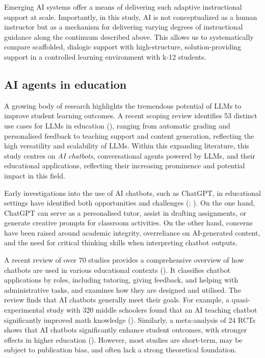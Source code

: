 \documentclass[
  11pt,
]{article}
\begin{document}
Emerging AI systems offer a means of delivering such adaptive instructional support at scale. Importantly, in this study, AI is not conceptualized as a human instructor but as a mechanism for delivering varying degrees of instructional guidance along the continuum described above. This allows us to systematically compare scaffolded, dialogic support with high-structure, solution-providing support in a controlled learning environment with k-12 students.

\subsection{AI agents in education}\label{ai-agents-in-education}

A growing body of research highlights the tremendous potential of LLMs to improve student learning outcomes. A recent scoping review identifies 53 distinct use cases for LLMs in education (), ranging from automatic grading and personalised feedback to teaching support and content generation, reflecting the high versatility and scalability of LLMs. Within this expanding literature, this study centres on \emph{AI chatbots}, conversational agents powered by LLMs, and their educational applications, reflecting their increasing prominence and potential impact in this field.

Early investigations into the use of AI chatbots, such as ChatGPT, in educational settings have identified both opportunities and challenges (; ). On the one hand, ChatGPT can serve as a personalised tutor, assist in drafting assignments, or generate creative prompts for classroom activities. On the other hand, concerns have been raised around academic integrity, overreliance on AI-generated content, and the need for critical thinking skills when interpreting chatbot outputs.

A recent review of over 70 studies provides a comprehensive overview of how chatbots are used in various educational contexts (). It classifies chatbot applications by roles, including tutoring, giving feedback, and helping with administrative tasks, and examines how they are designed and utilised. The review finds that AI chatbots generally meet their goals. For example, a quasi-experimental study with 320 middle schoolers found that an AI teaching chatbot significantly improved math knowledge (). Similarly, a meta-analysis of 24 RCTs shows that AI chatbots significantly enhance student outcomes, with stronger effects in higher education (). However, most studies are short-term, may be subject to publication bias, and often lack a strong theoretical foundation.
\end{document}
